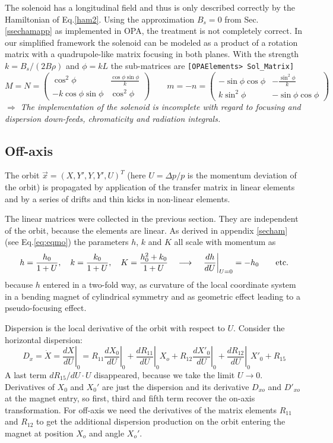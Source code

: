 \documentclass[12pt]{article}
\newcommand\beq{\begin{equation}}
\newcommand\eeq{\end{equation}}
\newcommand\todo[1]{$\Longrightarrow$ {\em #1} }
\newcommand\code[1]{{\tt [#1]}}
\begin{document}
The solenoid has a longitudinal field and thus is only described correctly by the Hamiltonian of Eq.\ref{ham2}. Using the approximation $B_s=0$ from Sec.\ref{ssechamapp} as implemented in OPA, the treatment is not completely correct. In our simplified framework the solenoid can be modeled as a product of a rotation matrix with a quadrupole-like matrix focusing in both planes.
With the strength $k= B_s/(2 B\rho)$ and $\phi=kL$ the sub-matrices are \code{OPAElements> Sol\_Matrix}
\beq
M=N=\left( \begin{array}{cc} \cos^2\phi & \frac{\cos\phi\sin\phi}{k} \\
-k \cos\phi\sin\phi & \cos^2\phi \end{array} \right)\qquad
m=-n = \left( \begin{array}{cc} -\sin\phi\cos\phi & -\frac{\sin^2\phi}{k} \\
k \sin^2\phi & -\sin\phi\cos\phi \end{array} \right)
\eeq
\todo{The implementation of the solenoid is incomplete with regard to focusing and dispersion down-feeds, chromaticity and radiation integrals.}


\subsection{Off-axis}
The orbit $\vec{x}=(X, Y', Y, Y',U)^T$ (here $U=\Delta p/p$ is the momentum deviation of the orbit) is propagated by application of the transfer matrix in linear elements and by a series of drifts and thin kicks in non-linear elements.

The linear matrices were collected in the previous section. They are independent of the orbit, because the elements are linear. As derived in appendix \ref{secham} (see Eq.\ref{eq:eqmo}) the parameters $h$, $k$ and $K$ all scale with momentum as
\beq
h=\frac{h_0}{1+U}, \quad k=\frac{k_0}{1+U}, \quad K=\frac{h_0^2+k_0}{1+U}
\quad\longrightarrow\quad
\left. \frac{dh}{dU}\right|_{U=0} = -h_0\qquad
\mbox{\rm etc.}
\eeq
because $h$ entered in a two-fold way, as curvature of the local coordinate system in a bending magnet of cylindrical symmetry and as geometric effect leading to a pseudo-focusing effect.

Dispersion is the local derivative of the orbit with respect to $U$. Consider the horizontal dispersion:
\[
D_x = \dot X = \left. \frac{dX}{dU}\right|_0 =
\left. R_{11} \frac{dX_0}{dU}\right|_0 +
\left. \frac{d R_{11}}{dU}\right|_0 X_o +
\left. R_{12} \frac{dX'_0}{dU}\right|_0 +
\left. \frac{d R_{12}}{dU}\right|_0 X'_0
+ R_{15}
\]
A last term $dR_{15}/dU\cdot U$ disappeared, because we take the limit $U\rightarrow 0$. Derivatives of $X_0$ and $X_0'$ are just the dispersion and its derivative $D_{xo}$ and $D'_{xo}$ at the magnet entry, so first, third and fifth term recover the on-axis transformation. For off-axis we need the derivatives of the matrix elements $R_{11}$ and $R_{12}$ to get the additional dispersion production on the orbit entering the magnet at position $X_o$ and angle $X_o'$.
\end{document}
